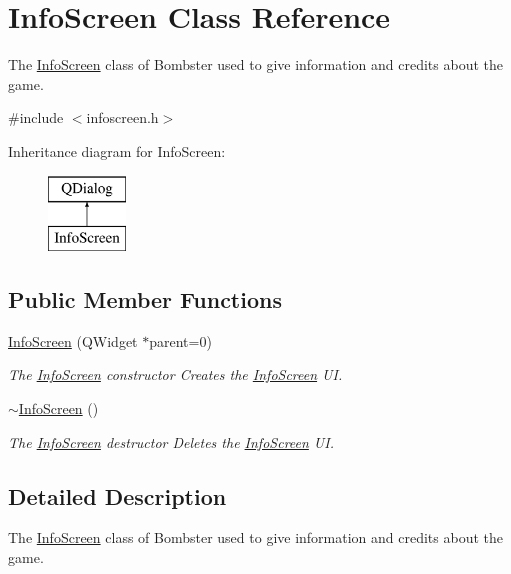 \hypertarget{class_info_screen}{\section{Info\-Screen Class Reference}
\label{class_info_screen}
}


The \hyperlink{class_info_screen}{Info\-Screen} class of Bombster used to give information and credits about the game.  




{\ttfamily \#include $<$infoscreen.\-h$>$}

Inheritance diagram for Info\-Screen\-:\begin{figure}[H]
\begin{center}
\leavevmode
\includegraphics[height=2.000000cm]{class_info_screen}
\end{center}
\end{figure}
\subsection*{Public Member Functions}
\begin{DoxyCompactItemize}
\item 
\hyperlink{class_info_screen_a334bc1b328e13d04889b2f166806de9e}{Info\-Screen} (Q\-Widget $\ast$parent=0)
\begin{DoxyCompactList}\small\item\em The \hyperlink{class_info_screen}{Info\-Screen} constructor Creates the \hyperlink{class_info_screen}{Info\-Screen} U\-I. \end{DoxyCompactList}\item 
\hyperlink{class_info_screen_adc57e13bff37154e1db3346d1ef5c77a}{$\sim$\-Info\-Screen} ()
\begin{DoxyCompactList}\small\item\em The \hyperlink{class_info_screen}{Info\-Screen} destructor Deletes the \hyperlink{class_info_screen}{Info\-Screen} U\-I. \end{DoxyCompactList}\end{DoxyCompactItemize}


\subsection{Detailed Description}
The \hyperlink{class_info_screen}{Info\-Screen} class of Bombster used to give information and credits about the game. 


